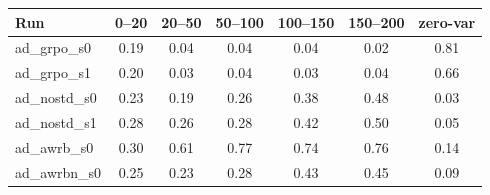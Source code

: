 \begin{tabular}{lcccccc}
\toprule
Run & 0--20 & 20--50 & 50--100 & 100--150 & 150--200 & zero-var\\
\midrule
ad\_grpo\_s0 & 0.19 & 0.04 & 0.04 & 0.04 & 0.02 & 0.81 \\
ad\_grpo\_s1 & 0.20 & 0.03 & 0.04 & 0.03 & 0.04 & 0.66 \\
ad\_nostd\_s0 & 0.23 & 0.19 & 0.26 & 0.38 & 0.48 & 0.03 \\
ad\_nostd\_s1 & 0.28 & 0.26 & 0.28 & 0.42 & 0.50 & 0.05 \\
ad\_awrb\_s0 & 0.30 & 0.61 & 0.77 & 0.74 & 0.76 & 0.14 \\
ad\_awrbn\_s0 & 0.25 & 0.23 & 0.28 & 0.43 & 0.45 & 0.09 \\
\bottomrule
\end{tabular}
